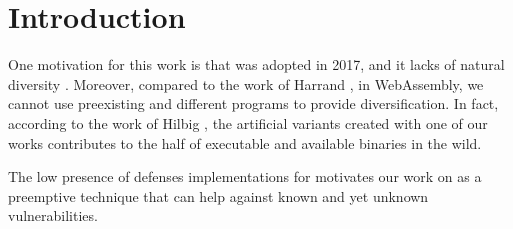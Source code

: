 \chapter{Introduction}



\newcommand{\subscript}[2]{$#1 _ #2$}

\newcommand{\rqone}{To what extent can we artifically generate program variants for WebAssembly?}

\newcommand{\rqtwo}{To what extent are the generated variants dynamically different?}
\newcommand{\rqthree}{To what extent do the artificial variants exhibit different execution times on Edge-Cloud platforms?}






One motivation for this work is that \wasm was adopted in 2017, and it lacks of natural diversity \citationneeded. Moreover, compared to the work of Harrand \etal \citationneeded, in WebAssembly, we cannot use preexisting and different programs to provide diversification. In fact, according to the work of Hilbig \etal \citationneeded, the artificial variants created with one of our works contributes to the half of executable and available \wasm binaries in the wild. 

The low presence of defenses implementations for \wasm motivates our work on as a preemptive technique that can help against known and yet unknown vulnerabilities.





